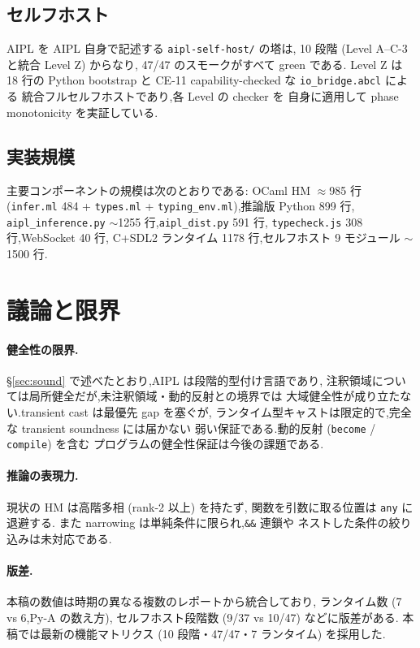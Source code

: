 \documentclass[11pt,a4paper]{article}
\newcommand{\code}[1]{\texttt{\small #1}}
\begin{document}
\subsection{セルフホスト}
AIPL を AIPL 自身で記述する \code{aipl-self-host/} の塔は,
10 段階 (Level A--C-3 と統合 Level Z) からなり,
47/47 のスモークがすべて green である.
Level Z は 18 行の Python bootstrap と
CE-11 capability-checked な \code{io\_bridge.abcl} による
統合フルセルフホストであり,各 Level の checker を
自身に適用して phase monotonicity を実証している.

\subsection{実装規模}
主要コンポーネントの規模は次のとおりである:
OCaml HM $\approx$985 行 (\code{infer.ml} 484 + \code{types.ml} +
\code{typing\_env.ml}),推論版 Python 899 行,
\code{aipl\_inference.py} $\sim$1255 行,\code{aipl\_dist.py} 591 行,
\code{typecheck.js} 308 行,WebSocket 40 行,
C+SDL2 ランタイム 1178 行,セルフホスト 9 モジュール $\sim$1500 行.

\section{議論と限界}\label{sec:discuss}

\paragraph{健全性の限界.}
\S\ref{sec:sound} で述べたとおり,AIPL は段階的型付け言語であり,
注釈領域については局所健全だが,未注釈領域・動的反射との境界では
大域健全性が成り立たない.transient cast は最優先 gap を塞ぐが,
ランタイム型キャストは限定的で,完全な transient soundness には届かない
弱い保証である.動的反射 (\code{become} / \code{compile}) を含む
プログラムの健全性保証は今後の課題である.

\paragraph{推論の表現力.}
現状の HM は高階多相 (rank-2 以上) を持たず,
関数を引数に取る位置は \code{any} に退避する.
また narrowing は単純条件に限られ,\code{\&\&} 連鎖や
ネストした条件の絞り込みは未対応である.

\paragraph{版差.}
本稿の数値は時期の異なる複数のレポートから統合しており,
ランタイム数 (7 vs 6,Py-A の数え方),
セルフホスト段階数 (9/37 vs 10/47) などに版差がある.
本稿では最新の機能マトリクス (10 段階・47/47・7 ランタイム) を採用した.
\end{document}
